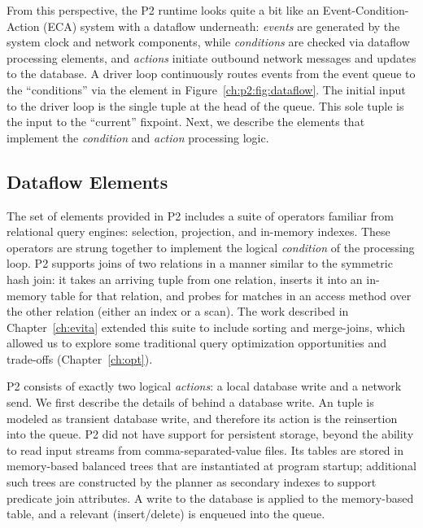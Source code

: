 From this perspective, the P2 runtime looks quite a bit like an
Event-Condition-Action (ECA) system with a dataflow underneath: {\em events}
are generated by the system clock and network components, while {\em
conditions} are checked via dataflow processing elements, and {\em actions}
initiate outbound network messages and updates to the database.  A driver loop
continuously routes events from the event queue to the ``conditions'' via the
 element in Figure~\ref{ch:p2:fig:dataflow}.  The initial input to
the driver loop is the single tuple at the head of the  queue.
This sole tuple is the input to the ``current'' fixpoint.  Next, we
describe the elements that implement the {\em condition} and {\em action}
processing logic.

\subsection{Dataflow Elements} 
\label{ch:p2:sec:dataflow_elements}

The set of elements provided in P2 includes a suite of operators familiar from
relational query engines: selection, projection, and in-memory indexes.  These
operators are strung together to implement the logical {\em condition} of the 
processing loop.  P2 supports joins of two relations in a manner similar to the
symmetric hash join: it takes an arriving tuple from one relation, inserts it
into an in-memory table for that relation, and probes for matches in an access
method over the other relation (either an index or a scan).  The work described
in Chapter~\ref{ch:evita} extended this suite to include sorting and
merge-joins, which allowed us to explore some traditional query optimization
opportunities and trade-offs (Chapter~\ref{ch:opt}).

P2 consists of exactly two logical {\em actions}: a local database write and a
network send.  We first describe the details of behind a database write.  An
 tuple is modeled as transient database write, and therefore its
action is the reinsertion into the  queue.  P2 did not have support
for persistent storage, beyond the ability to read input streams from
comma-separated-value files.  Its tables are stored in memory-based balanced
trees that are instantiated at program startup; additional such trees are
constructed by the planner as secondary indexes to support predicate join
attributes.  A write to the database is applied to the memory-based table, and
a relevant (insert/delete)  is enqueued into the  queue.

